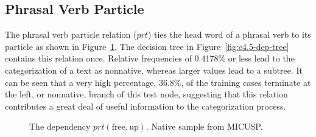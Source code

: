 \documentclass[main.tex]{subfiles}
\begin{document}

\subsection{Phrasal Verb Particle}

The phrasal verb particle relation ($prt$) ties the head word of a phrasal verb to its particle as shown in Figure~\ref{ex:prt-en1}. The decision tree in Figure~\ref{fig:c4.5-dep-tree} contains this relation once. Relative frequencies of 0.4178\% or less lead to the categorization of a text as nonnative, whereas larger values lead to a subtree. It can be seen that a very high percentage, 36.8\%, of the training cases terminate at the left, or nonnative, branch of this test node, suggesting that this relation contributes a great deal of useful information to the categorization process.

\begin{figure}[h]
\centering
{}
\caption{The dependency $prt(\text{free},\text{up})$. Native sample from MICUSP.}
\label{ex:prt-en1}
\end{figure}
\end{document}
